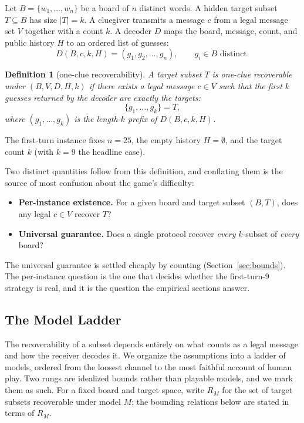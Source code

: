 \documentclass[11pt]{article}
\newtheorem{definition}{Definition}
\begin{document}
Let $B = \{w_1, \dots, w_n\}$ be a board of $n$ distinct words. A hidden target
subset $T \subseteq B$ has size $|T| = k$. A cluegiver transmits a message $c$
from a legal message set $V$ together with a count $k$. A decoder $D$ maps the
board, message, count, and public history $H$ to an ordered list of guesses:
\[
  D(B, c, k, H) = (g_1, g_2, \dots, g_n), \qquad g_i \in B \text{ distinct.}
\]

\begin{definition}[one-clue recoverability]
A target subset $T$ is one-clue recoverable under $(B, V, D, H, k)$ if there
exists a legal message $c \in V$ such that the first $k$ guesses returned by the
decoder are exactly the targets:
\[
  \{ g_1, \dots, g_k \} = T,
\]
where $(g_1, \dots, g_k)$ is the length-$k$ prefix of $D(B, c, k, H)$.
\end{definition}

The first-turn instance fixes $n = 25$, the empty history $H = \emptyset$, and
the target count $k$ (with $k = 9$ the headline case).

Two distinct quantities follow from this definition, and conflating them is the
source of most confusion about the game's difficulty:
\begin{itemize}
  \item \textbf{Per-instance existence.} For a given board and target subset
    $(B, T)$, does any legal $c \in V$ recover $T$?
  \item \textbf{Universal guarantee.} Does a single protocol recover \emph{every}
    $k$-subset of \emph{every} board?
\end{itemize}
The universal guarantee is settled cheaply by counting (Section~\ref{sec:bounds}).
The per-instance question is the one that decides whether the first-turn-9
strategy is real, and it is the question the empirical sections answer.

\subsection{The Model Ladder}

The recoverability of a subset depends entirely on what counts as a legal message
and how the receiver decodes it. We organize the assumptions into a ladder of
models, ordered from the loosest channel to the most faithful account of human
play. Two rungs are idealized bounds rather than playable models, and we mark
them as such. For a fixed board and target space, write $R_M$ for the set of
target subsets recoverable under model $M$; the bounding relations below are
stated in terms of $R_M$.
\end{document}
